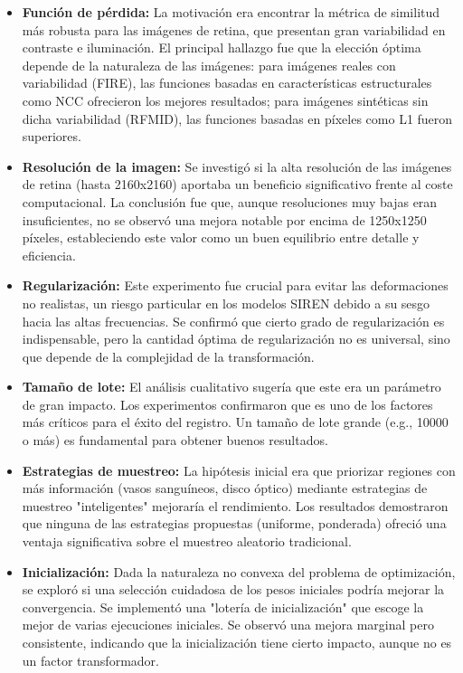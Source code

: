 \begin{itemize}
\item \textbf{Función de pérdida:} La motivación era encontrar la métrica de similitud más robusta para las imágenes de retina, que presentan gran variabilidad en contraste e iluminación. El principal hallazgo fue que la elección óptima depende de la naturaleza de las imágenes: para imágenes reales con variabilidad (FIRE), las funciones basadas en características estructurales como NCC ofrecieron los mejores resultados; para imágenes sintéticas sin dicha variabilidad (RFMID), las funciones basadas en píxeles como L1 fueron superiores.

\item \textbf{Resolución de la imagen:} Se investigó si la alta resolución de las imágenes de retina (hasta 2160x2160) aportaba un beneficio significativo frente al coste computacional. La conclusión fue que, aunque resoluciones muy bajas eran insuficientes, no se observó una mejora notable por encima de 1250x1250 píxeles, estableciendo este valor como un buen equilibrio entre detalle y eficiencia.

\item \textbf{Regularización:} Este experimento fue crucial para evitar las deformaciones no realistas, un riesgo particular en los modelos SIREN debido a su sesgo hacia las altas frecuencias. Se confirmó que cierto grado de regularización es indispensable, pero la cantidad óptima de regularización no es universal, sino que depende de la complejidad de la transformación.

\item \textbf{Tamaño de lote:} El análisis cualitativo sugería que este era un parámetro de gran impacto. Los experimentos confirmaron que es uno de los factores más críticos para el éxito del registro. Un tamaño de lote grande (e.g., 10000 o más) es fundamental para obtener buenos resultados.

\item \textbf{Estrategias de muestreo:} La hipótesis inicial era que priorizar regiones con más información (vasos sanguíneos, disco óptico) mediante estrategias de muestreo "inteligentes" mejoraría el rendimiento. Los resultados demostraron que ninguna de las estrategias propuestas (uniforme, ponderada) ofreció una ventaja significativa sobre el muestreo aleatorio tradicional.

\item \textbf{Inicialización:} Dada la naturaleza no convexa del problema de optimización, se exploró si una selección cuidadosa de los pesos iniciales podría mejorar la convergencia. Se implementó una "lotería de inicialización" que escoge la mejor de varias ejecuciones iniciales. Se observó una mejora marginal pero consistente, indicando que la inicialización tiene cierto impacto, aunque no es un factor transformador.


\end{itemize}
